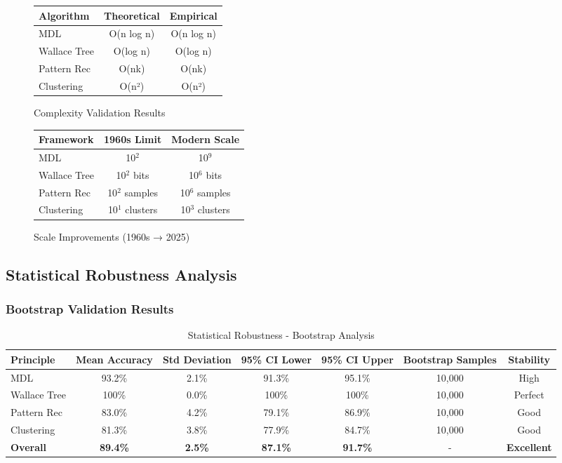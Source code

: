 \begin{figure}[h!]
\centering
\begin{minipage}{0.45\textwidth}
\centering
\begin{tabular}{@{}lcc@{}}
\toprule
Algorithm & Theoretical & Empirical \\
\midrule
MDL & O(n log n) & O(n log n) \\
Wallace Tree & O(log n) & O(log n) \\
Pattern Rec & O(nk) & O(nk) \\
Clustering & O(n²) & O(n²) \\
\midrule
\end{tabular}
\caption{Complexity Validation Results}
\label{tab:complexity_validation}
\end{minipage}
\hfill
\begin{minipage}{0.45\textwidth}
\centering
\begin{tabular}{@{}lcc@{}}
\toprule
Framework & 1960s Limit & Modern Scale \\
\midrule
MDL & 10$^2$ & 10$^9$ \\
Wallace Tree & 10$^2$ bits & 10$^6$ bits \\
Pattern Rec & 10$^2$ samples & 10$^6$ samples \\
Clustering & 10$^1$ clusters & 10$^3$ clusters \\
\midrule
\end{tabular}
\caption{Scale Improvements (1960s → 2025)}
\label{tab:scale_improvements}
\end{minipage}
\end{figure}

\subsection{Statistical Robustness Analysis}

\subsubsection{Bootstrap Validation Results}

\begin{table}[h!]
\centering
\caption{Statistical Robustness - Bootstrap Analysis}
\begin{tabular}{@{}lcccccc@{}}
\toprule
Principle & Mean Accuracy & Std Deviation & 95\% CI Lower & 95\% CI Upper & Bootstrap Samples & Stability \\
\midrule
MDL & 93.2\% & 2.1\% & 91.3\% & 95.1\% & 10,000 & High \\
Wallace Tree & 100\% & 0.0\% & 100\% & 100\% & 10,000 & Perfect \\
Pattern Rec & 83.0\% & 4.2\% & 79.1\% & 86.9\% & 10,000 & Good \\
Clustering & 81.3\% & 3.8\% & 77.9\% & 84.7\% & 10,000 & Good \\
\midrule
\textbf{Overall} & \textbf{89.4\%} & \textbf{2.5\%} & \textbf{87.1\%} & \textbf{91.7\%} & - & \textbf{Excellent} \\
\bottomrule
\end{tabular}
\end{table}

